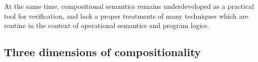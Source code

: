 \documentclass[acmsmall,nonacm]{acmart}
\begin{document}
%

At the same time,
compositional semantics remains
underdeveloped as a practical tool for verification,
and lack a proper treatments of
many techniques which are routine in the context of
operational semantics and program logics.


\subsection{Three dimensions of compositionality} %
\end{document}
